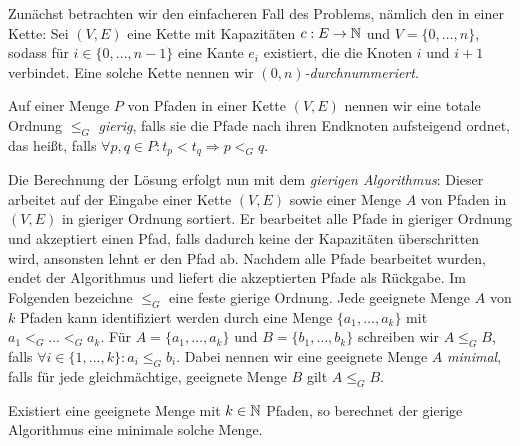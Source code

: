 Zunächst betrachten wir den einfacheren Fall des Problems, nämlich den in einer Kette:
   Sei $(V,E)$ eine Kette mit Kapazitäten $c: E \to \mathbb N$ und $V=\{0,\dots,n\}$, sodass für $i \in \{0,\dots,n-1\}$
   eine Kante $e_i$ existiert, die die Knoten $i$ und $i+1$ verbindet.
   Eine solche Kette nennen wir {\em $(0, n)$-durchnummeriert}.
   \begin{definition}
       Auf einer Menge $P$ von Pfaden in einer Kette $(V,E)$ nennen wir eine totale Ordnung $\leq_G$ {\em gierig},
       falls sie die Pfade nach ihren Endknoten aufsteigend ordnet, das heißt, falls
       $\forall p, q \in P \colon t_p < t_q \Rightarrow p <_G q$.
   \end{definition}
   Die Berechnung der Lösung erfolgt nun mit dem {\em gierigen Algorithmus}: Dieser arbeitet auf der Eingabe einer
   Kette $(V,E)$ sowie einer Menge $A$ von Pfaden in $(V,E)$ in gieriger Ordnung sortiert.
   Er bearbeitet alle Pfade in gieriger Ordnung und akzeptiert einen Pfad, falls dadurch keine der Kapazitäten
   überschritten wird, ansonsten lehnt er den Pfad ab.
   Nachdem alle Pfade bearbeitet wurden, endet der Algorithmus und liefert die akzeptierten Pfade als Rückgabe.
   Im Folgenden bezeichne $\leq_G$ eine feste gierige Ordnung.
   Jede geeignete Menge $A$ von $k$ Pfaden kann identifiziert werden durch eine Menge $\{a_1, \dots, a_k\}$ mit
   $a_1 <_G \dots <_G a_k$.
   Für $A=\{a_1,\dots,a_k\}$ und $B=\{b_1,\dots,b_k\}$ schreiben wir $A \leq_G B$, falls $\forall i \in \{1,\dots,k\}\colon a_i \leq_G b_i$.
   Dabei nennen wir eine geeignete Menge $A$ {\em minimal}, falls für jede gleichmächtige, geeignete Menge $B$
   gilt $A \leq_G B$.
   \begin{lemma}
       Existiert eine geeignete Menge mit $k \in \mathbb N$ Pfaden, so berechnet der gierige Algorithmus eine minimale
       solche Menge.
   \end{lemma}
